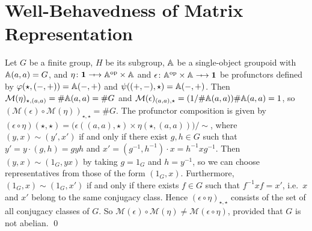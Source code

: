 \section{Well-Behavedness of Matrix Representation}

\newcommand{\MatTrans}[1]{\mathcal{M}({#1})}
\newcommand{\rsem}[1]{(\!|{#1}|\!)}
\newcommand{\SProf}{\mathbf{SProf}}
\newcommand{\WRel}{\mathbf{WRel}}
\newcommand{\Real}{\mathbb{R}}



\tk{to do: define \( \SProf_\omega \)}


\newcommand{\TerminalCategory}{\mathbf{1}}
\begin{example}
    Let \( G \) be a finite group, \( H \) be its subgroup, \( \mathbb{A} \) be a single-object groupoid with \( \mathbb{A}(a, a) = G \), and \( \eta \colon \TerminalCategory \profarrow \Grp^{\op} \times \Grp \) and \( \epsilon \colon \Grp^{\op} \times \Grp \profarrow \TerminalCategory \) be profunctors defined by \( \varphi(\star, ({-}, {+})) = \mathbb{A}({-}, {+}) \) and \( \psi(({+}, {-}), \star) = \mathbb{A}({-}, {+}) \).
    Then \( \MatTrans{\eta}_{\star, (a,a)} = \#\Grp(a,a) = \#G \) and \( \MatTrans{\epsilon}_{(a,a), \star} = (1/\#\Grp(a,a))\#\Grp(a,a) = 1 \), so \( (\MatTrans{\epsilon} \circ \MatTrans{\eta})_{\star, \star} = \#G \).
    The profunctor composition is given by \( (\epsilon \circ \eta)(\star, \star) = \big( \epsilon((a,a), \star) \times \eta(\star, (a,a)) \big) / {\sim} \), where \( (y, x) \sim (y', x') \) if and only if there exist \( g, h \in G \) such that \( y' = y \cdot (g,h) = g y h \) and \( x' = (g^{-1}, h^{-1}) \cdot x = h^{-1} x g^{-1} \).
    Then \( (y, x) \sim (1_G, yx) \) by taking \( g = 1_G \) and \( h = y^{-1} \), so we can choose representatives from those of the form \( (1_G, x) \).
    Furthermore, \( (1_G, x) \sim (1_G, x') \) if and only if there exists \( f \in G \) such that \( f^{-1} x f = x' \), i.e.~\( x \) and \( x' \) belong to the same conjugacy class.
    Hence \( (\epsilon \circ \eta)_{\star, \star} \) consists of the set of all conjugacy classes of \( G \).
    So \( \MatTrans{\epsilon} \circ \MatTrans{\eta} \neq \MatTrans{\epsilon \circ \eta} \), provided that \( G \) is not abelian.
    \qed
\end{example}


